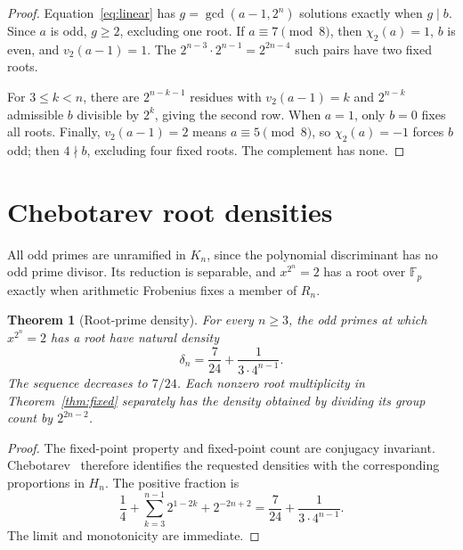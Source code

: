 \documentclass[10pt]{article}
\newtheorem{theorem}{Theorem}
\newcommand{\F}{\mathbb F}
\begin{document}
\begin{proof}
Equation~\eqref{eq:linear} has
$g=\gcd(a-1,2^n)$ solutions exactly when $g\mid b$.  Since $a$ is odd,
$g\ge2$, excluding one root.  If $a\equiv7\pmod8$, then
$\chi_2(a)=1$, $b$ is even, and $v_2(a-1)=1$.  The
$2^{n-3}\cdot2^{n-1}=2^{2n-4}$ such pairs have two fixed roots.

For $3\le k<n$, there are $2^{n-k-1}$ residues with
$v_2(a-1)=k$ and $2^{n-k}$ admissible $b$ divisible by $2^k$, giving the
second row.  When $a=1$, only $b=0$ fixes all roots.  Finally,
$v_2(a-1)=2$ means $a\equiv5\pmod8$, so $\chi_2(a)=-1$ forces $b$ odd;
then $4\nmid b$, excluding four fixed roots.  The complement has none.
\end{proof}

\section{Chebotarev root densities}
All odd primes are unramified in $K_n$, since the polynomial discriminant
has no odd prime divisor.  Its reduction is separable, and
$x^{2^n}=2$ has a root over $\F_p$ exactly when arithmetic Frobenius fixes
a member of $R_n$.

\begin{theorem}[Root-prime density]\label{thm:density}
For every $n\ge3$, the odd primes at which $x^{2^n}=2$ has a root have
natural density
\begin{equation}\label{eq:density}
 \delta_n=\frac7{24}+\frac1{3\cdot4^{n-1}}.
\end{equation}
The sequence decreases to $7/24$.  Each nonzero root multiplicity in
Theorem~\ref{thm:fixed} separately has the density obtained by dividing
its group count by $2^{2n-2}$.
\end{theorem}

\begin{proof}
The fixed-point property and fixed-point count are conjugacy invariant.
Chebotarev~\cite{Neukirch} therefore identifies the requested densities
with the corresponding proportions in $H_n$.  The positive fraction is
\[
 \frac14+\sum_{k=3}^{n-1}2^{1-2k}+2^{-2n+2}
 =\frac7{24}+\frac1{3\cdot4^{n-1}}.
\]
The limit and monotonicity are immediate.
\end{proof}

\begin{center}
\end{center}
\fi
\end{document}
